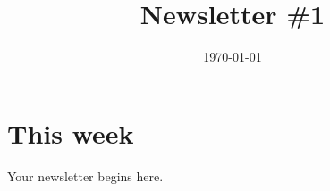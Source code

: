 \documentclass[12pt]{article}
\title{Newsletter \#1}
\date{\today}
\begin{document}
\maketitle

\section*{This week}

Your newsletter begins here.
\end{document}
